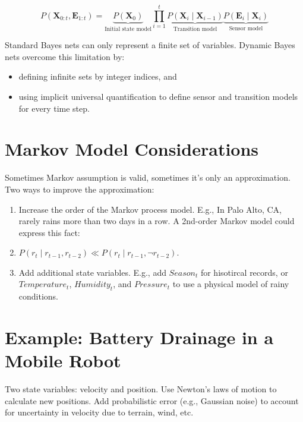\documentclass[11pt]{article}
\begin{document}
\begin{equation*}
P(\bm{X}_{0:t}, \bm{E}_{1:t}) = \underbrace{P(\bm{X}_0)}_{\text{Initial state model}} \prod_{i=1}^t \underbrace{P(\bm{X}_i \mid \bm{X}_{i-1})}_{\text{Transition model}} \underbrace{P(\bm{E}_i \mid \bm{X}_i)}_{\text{Sensor model}} \tag{14.3}
\end{equation*}

Standard Bayes nets can only represent a finite set of variables.  Dynamic Bayes nets overcome this limitation by:

\begin{itemize}
\item defining infinite sets by integer indices, and
\item using implicit universal quantification to define sensor and transition models for every time step.
\end{itemize}
\section{Markov Model Considerations}
\label{sec:org0a78957}

Sometimes Markov assumption is valid, sometimes it's only an approximation.  Two ways to improve the approximation:

\begin{enumerate}
\item Increase the order of the Markov process model.  E.g., In Palo Alto, CA, rarely rains more than two days in a row.  A 2nd-order Markov model could express this fact:

\item \(P(r_t \mid r_{t-1}, r_{t-2}) \ll P(r_t \mid r_{t-1}, \neg r_{t-2})\).

\item Add additional state variables.  E.g., add \(Season_t\) for hisotircal records, or \(Temperature_t\), \(Humidity_t\), and \(Pressure_t\) to use a physical model of rainy conditions.
\end{enumerate}
\section{Example: Battery Drainage in a Mobile Robot}
\label{sec:orgbd61434}

Two state variables: velocity and position.  Use Newton's laws of motion to calculate new positions.  Add probabilistic error (e.g., Gaussian noise) to account for uncertainty in velocity due to terrain, wind, etc.
\end{document}
